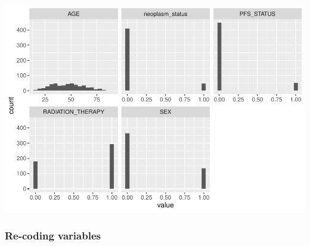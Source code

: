 \documentclass[
  11pt,
]{article}
\begin{document}
\includegraphics{thyroid_1_files/figure-latex/unnamed-chunk-3-1.pdf}

\newpage
\subsubsection{Re-coding variables}
\end{document}
